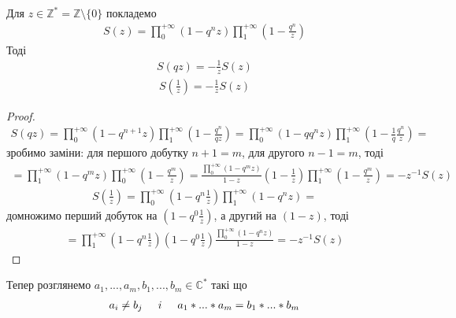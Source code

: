 \documentclass[12pt,a4paper]{article}
\begin{document}
\begin{twerd} Для $z \in \mathbb{Z}^{*}=\mathbb{Z}\setminus \lbrace 0 \rbrace$\label{{Z}^{*}} покладемо
\[\begin{array}{l} 
 S(z)= \prod\limits_{0}^{+\infty } ( 1-q^{n}z ) \prod\limits_{1}^{+\infty }( 1-\frac{q^{n}}{z})
 \end{array}\]\label{S(z)}
Тоді
\begin{equation}\label{s1}
\begin{array}{l}
   S(qz)=-\frac{1}{z}S(z)
 \end{array}
\end{equation}  
\begin{equation}\label{s2}
\begin{array}{l}        
   S(\frac{1}{z})= -\frac{1}{z}S(z)
\end{array}
\end{equation}
\end{twerd}
\begin{proof}
\[\begin{array}{l} 
S(qz)= \prod\limits_{0}^{+\infty } ( 1-q^{n+1}z ) \prod\limits_{1}^{+\infty }( 1-\frac{q^{n}}{qz})=
 \prod\limits_{0}^{+\infty } ( 1-qq^{n}z ) \prod\limits_{1}^{+\infty }( 1-\frac{1}{q}\frac{q^{n}}{z})=
 \end{array}\]
зробимо заміни: для першого добутку $n+1=m$, для другого $n-1=m$, тоді 
\[\begin{array}{l} 
 =\prod\limits_{1}^{+\infty } ( 1-q^{m}z ) \prod\limits_{0}^{+\infty }( 1-\frac{q^{m}}{z})=\frac{\prod\limits_{0}^{+\infty } ( 1-q^{m}z )}{1-z}(1-\frac{1}{z})\prod\limits_{1}^{+\infty }( 1-\frac{q^{m}}{z})=-z^{-1}S(z)
\end{array}\]
\[\begin{array}{l} 
 S(\frac{1}{z})= \prod\limits_{0}^{+\infty } ( 1-q^{n}\frac{1}{z} ) \prod\limits_{1}^{+\infty }( 1-q^{n}z)=
\end{array}\]
домножимо перший добуток на $(1-q^{0}\frac{1}{z})$, а другий на $(1-z)$, тоді 
\[\begin{array}{l} 
  =\prod\limits_{1}^{+\infty } ( 1-q^{n}\frac{1}{z} )(1-q^{0}\frac{1}{z})\frac{    \prod\limits_{0}^{+\infty }( 1-q^{n}z)}{1-z}=-z^{-1}S(z)
 \end{array}\]
\end{proof}
\vspace{1,5cm}

Тепер розглянемо $a_{1},...,a_{m},b_{1},...,b_{m}\in \mathbb{C}^{*}$ такі що\\
\begin{equation}\label{w1}
\begin{array}{l} 
 a_{i}\neq b_{j} \hspace{0,5cm}  i  \hspace{0,5cm} a_{1}*...*a_{m}=b_{1}*...*b_{m}
\end{array}
\end{equation} 
\end{document}
